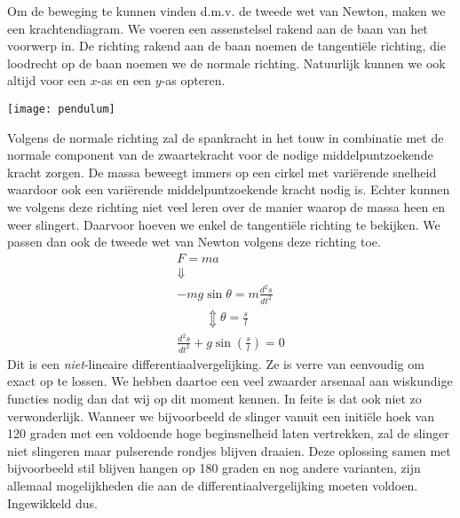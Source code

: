 \documentclass{ximera}
\begin{document}
	Om de beweging te kunnen vinden d.m.v. de tweede wet van Newton, maken we een krachtendiagram. We voeren een assenstelsel rakend aan de baan van het voorwerp in. De richting rakend aan de baan noemen de tangentiële richting, die loodrecht op de baan noemen we de normale richting. Natuurlijk kunnen we ook altijd voor een $x$-as en een $y$-as opteren.
	\begin{image}
	\texttt{[image: pendulum]}
	\end{image}
	Volgens de normale richting zal de spankracht in het touw in combinatie met de normale component van de zwaartekracht voor de nodige middelpuntzoekende kracht zorgen. De massa beweegt immers op een cirkel met variërende snelheid waardoor ook een variërende middelpuntzoekende kracht nodig is. Echter kunnen we volgens deze richting niet veel leren over de manier waarop de massa heen en weer slingert. Daarvoor hoeven we enkel de tangentiële richting te bekijken. We passen dan ook de tweede wet van Newton volgens deze richting toe. 
	\begin{gather*}
	F=ma\\
	\Downarrow\\
	-mg\sin\theta=m\frac{d^2s}{dt^2}\\
	\phantom{\theta=\frac{s}{l}}\Updownarrow\theta=\frac{s}{l}\\
	\frac{d^2s}{dt^2}+g\sin\left(\frac{s}{l}\right)=0
	\end{gather*}
	Dit is een \emph{niet}-lineaire differentiaalvergelijking. Ze is verre van eenvoudig om exact op te lossen. We hebben daartoe een veel zwaarder arsenaal aan wiskundige functies nodig dan dat wij op dit moment kennen. In feite is dat ook niet zo verwonderlijk. Wanneer we bijvoorbeeld de slinger vanuit een initiële hoek van 120 graden met een voldoende hoge beginsnelheid laten vertrekken, zal de slinger niet slingeren maar pulserende rondjes blijven draaien. Deze oplossing samen met bijvoorbeeld stil blijven hangen op 180 graden en nog andere varianten, zijn allemaal mogelijkheden die aan de differentiaalvergelijking moeten voldoen. Ingewikkeld dus.
	
\end{document}
